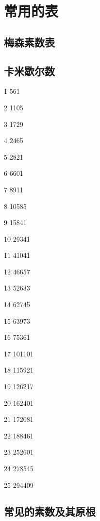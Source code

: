\chapter{常用的表}


\section{梅森素数表}


\section{卡米歇尔数}
1 561

2 1105

3 1729

4 2465

5 2821

6 6601

7 8911

8 10585

9 15841

10 29341

11 41041

12 46657

13 52633

14 62745

15 63973

16 75361

17 101101

18 115921

19 126217

20 162401

21 172081

22 188461

23 252601

24 278545

25 294409

\section{常见的素数及其原根}

